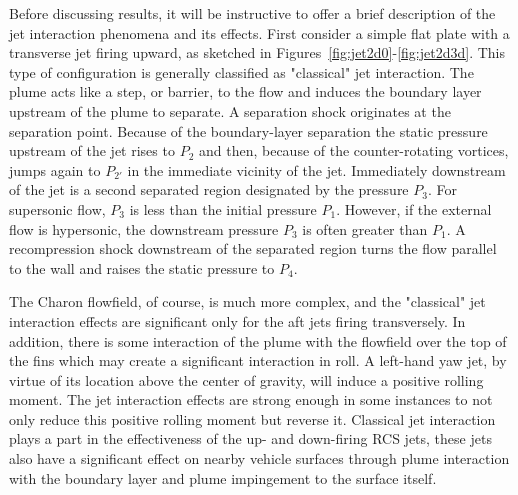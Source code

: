 \documentclass[12pt]{article}
\begin{document}

Before discussing results, it will be instructive to offer a brief description of the jet interaction phenomena and its effects. First consider a simple flat plate with a transverse jet firing upward, as sketched in Figures~\ref{fig:jet2d0}-\ref{fig:jet2d3d}. This type of configuration is generally classified as "classical" jet interaction. The plume acts like a step, or barrier, to the flow and induces the boundary layer upstream of the plume to separate. A separation shock originates at the separation point. Because of the boundary-layer separation the static pressure upstream of the jet rises to $P_2$ and then, because of the counter-rotating vortices, jumps again to $P_{2'}$ in the immediate vicinity of the jet. Immediately downstream of the jet is a second separated region designated by the pressure $P_3$. For supersonic flow, $P_3$ is less than the initial pressure $P_1$. However, if the external flow is hypersonic, the downstream pressure $P_3$ is often greater than $P_1$. A recompression shock downstream of the separated region turns the flow parallel to the wall and raises the static pressure to $P_4$. 

The Charon flowfield, of course, is much more complex, and the "classical" jet interaction effects are significant only for the aft jets firing transversely. In addition, there is some interaction of the plume with the flowfield over the top of the fins which may create a significant interaction in roll. A left-hand yaw jet, by virtue of its location above the center of gravity, will induce a positive rolling moment. The jet interaction effects are strong enough in some instances to not only reduce this positive rolling moment but reverse it. Classical jet interaction plays a part in the effectiveness of the up- and down-firing RCS jets, these jets also have a significant effect on nearby vehicle surfaces through plume interaction with the boundary layer and plume impingement to the surface itself.

\end{document}
